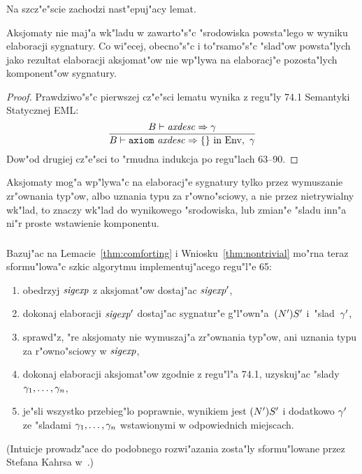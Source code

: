 \subsubsection{\seccomforting}
\label{sec:comforting}

Na szcz"e"scie zachodzi nast"epuj"acy lemat.
\begin{lem}[\thmcomforting]
\label{thm:comforting}
Aksjomaty nie maj"a wk"ladu w za\-war\-to"s"c "srodowiska powsta"lego w wyniku elaboracji sygnatury.
Co wi"ecej, o\-bec\-no"s"c i to"rsamo"s"c "slad"ow powsta"lych jako rezultat elaboracji aksjomat"ow
nie wp"lywa na elaboracj"e pozosta"lych komponent"ow sygnatury.
\end{lem}

\begin{proof}
Prawdziwo"s"c pierwszej cz"e"sci lematu wynika z regu"ly 74.1 
Semantyki Statycznej EML:
$$
\frac{B\vdash{\it axdesc}\Rightarrow\gamma}
     {B\vdash{\tt axiom}\ {\it axdesc}\Rightarrow\{\}\ \mbox{\rm in}\ {\rm Env},\ \gamma}
$$
Dow"od drugiej cz"e"sci to "rmudna indukcja po regu"lach 63--90.
\end{proof}

\begin{cor}
\label{thm:nontrivial}
Aksjomaty mog"a wp"lywa"c na elaboracj"e sygnatury 
tylko przez wymuszanie zr"ownania typ"ow, albo uznania typu za r"owno"sciowy,
a nie przez nietrywialny wk"lad, to znaczy wk"lad do wynikowego "srodowiska,
lub zmian"e "sladu inn"a ni"r proste wstawienie komponentu.
\end{cor}

\subsubsection{\secmature}
\label{sec:mature}

Bazuj"ac na Lemacie~\ref{thm:comforting} i Wniosku~\ref{thm:nontrivial} 
mo"rna teraz sformu"lowa"c szkic algorytmu implementuj"acego regu"l"e 65:
\begin{enumerate}
\item obedrzyj ${\it sigexp}$ z aksjomat"ow dostaj"ac ${\it sigexp}'$,
\label{step:strip}
\item dokonaj elaboracji ${\it sigexp}'$ dostaj"ac sygnatur"e g"l"own"a~$(N')S'$ i~"slad~$\gamma'$,
\label{step:elab_sig'}
\item sprawd"z, "re aksjomaty nie wymuszaj"a zr"ownania typ"ow, 
      ani uznania typu za r"owno"sciowy w ${\it sigexp}$,
\label{step:check}
\item dokonaj elaboracji aksjomat"ow zgodnie z regu"l"a 74.1, uzyskuj"ac "slady $\gamma_1,\dots,\gamma_n$,
\label{step:elab_axiom}
\item je"sli wszystko przebieg"lo poprawnie, wynikiem jest $(N')S'$ i dodatkowo $\gamma'$ 
      ze "sladami $\gamma_1,\dots,\gamma_n$ wstawionymi w odpowiednich miejscach.
\label{step:insert}
\end{enumerate}
(Intuicje prowadz"ace do podobnego rozwi"azania zosta"ly sformu"lowane przez Stefana Kahrsa w~\cite{Kah94}.)

